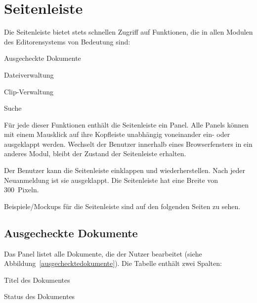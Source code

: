 %


\chapter{Seitenleiste}

Die Seitenleiste bietet stets schnellen Zugriff auf Funktionen, die in allen
Modulen des Editorensystems von Bedeutung sind:
\begin{compactitem}
  \item Ausgecheckte Dokumente
  \item Dateiverwaltung
  \item Clip-Verwaltung
  \item Suche
\end{compactitem}

Für jede dieser Funktionen enthält die Seitenleiste ein Panel. Alle Panels
können mit einem Mausklick auf ihre Kopfleiste unabhängig voneinander ein-
oder ausgeklappt werden. Wechselt der Benutzer innerhalb eines Browserfensters
in ein anderes Modul, bleibt der Zustand der Seitenleiste erhalten.

Der Benutzer kann die Seitenleiste einklappen und wiederherstellen. Nach jeder
Neuanmeldung ist sie ausgeklappt. Die Seitenleiste hat eine Breite von
300~Pixeln.

Beispiele/Mockups für die Seitenleiste sind auf den folgenden Seiten zu sehen.

\section{Ausgecheckte Dokumente}
    

  Das Panel  listet alle Dokumente, die der
  Nutzer bearbeitet (siehe Abbildung~\vref{ausgechecktedokumente}).
  Die Tabelle enthält zwei Spalten:
  \begin{compactitem}
    \item Titel des Dokumentes
    \item Status des Dokumentes
  \end{compactitem}


